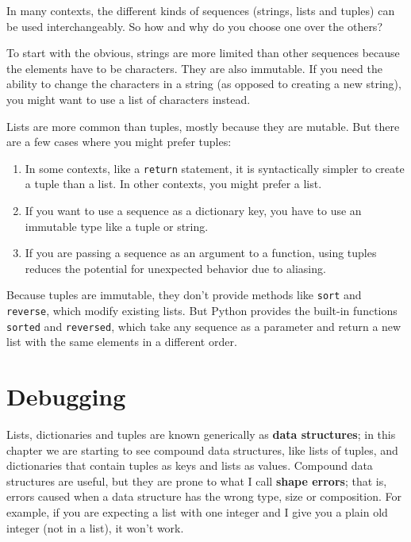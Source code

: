 \documentclass[10pt]{book}
\begin{document}
In many contexts, the different kinds of sequences (strings, lists and
tuples) can be used interchangeably.  So how and why do you choose one
over the others?

To start with the obvious, strings are more limited than other
sequences because the elements have to be characters.  They are
also immutable.  If you need the ability to change the characters
in a string (as opposed to creating a new string), you might
want to use a list of characters instead.

Lists are more common than tuples, mostly because they are mutable.
But there are a few cases where you might prefer tuples:

\begin{enumerate}

\item In some contexts, like a {\tt return} statement, it is
syntactically simpler to create a tuple than a list.  In other
contexts, you might prefer a list.

\item If you want to use a sequence as a dictionary key, you
have to use an immutable type like a tuple or string.

\item If you are passing a sequence as an argument to a function,
using tuples reduces the potential for unexpected behavior
due to aliasing.

\end{enumerate}

Because tuples are immutable, they don't provide methods
like {\tt sort} and {\tt reverse}, which modify existing lists.
But Python provides the built-in functions {\tt sorted}
and {\tt reversed}, which take any sequence as a parameter
and return a new list with the same elements in a different
order.


\section{Debugging}

Lists, dictionaries and tuples are known generically as {\bf data
  structures}; in this chapter we are starting to see compound data
structures, like lists of tuples, and dictionaries that contain tuples
as keys and lists as values.  Compound data structures are useful, but
they are prone to what I call {\bf shape errors}; that is, errors
caused when a data structure has the wrong type, size or composition.
For example, if you are expecting a list with one integer and I
give you a plain old integer (not in a list), it won't work.
\end{document}
